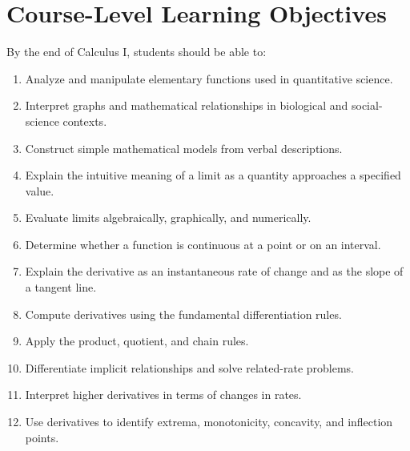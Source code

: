 \documentclass[11pt]{article}
\begin{document}
\section{Course-Level Learning Objectives}

By the end of Calculus I, students should be able to:

\begin{enumerate}[label=\textbf{LO\arabic*.}]
    \item Analyze and manipulate elementary functions used in quantitative
          science.
          
    \item Interpret graphs and mathematical relationships in biological and
          social-science contexts.
          
    \item Construct simple mathematical models from verbal descriptions.
    
    \item Explain the intuitive meaning of a limit as a quantity approaches
          a specified value.
          
    \item Evaluate limits algebraically, graphically, and numerically.
    
    \item Determine whether a function is continuous at a point or on an
          interval.
          
    \item Explain the derivative as an instantaneous rate of change and as
          the slope of a tangent line.
          
    \item Compute derivatives using the fundamental differentiation rules.
    
    \item Apply the product, quotient, and chain rules.
    
    \item Differentiate implicit relationships and solve related-rate
          problems.
          
    \item Interpret higher derivatives in terms of changes in rates.
    
    \item Use derivatives to identify extrema, monotonicity, concavity, and
          inflection points.
          

\end{enumerate}
\end{document}
